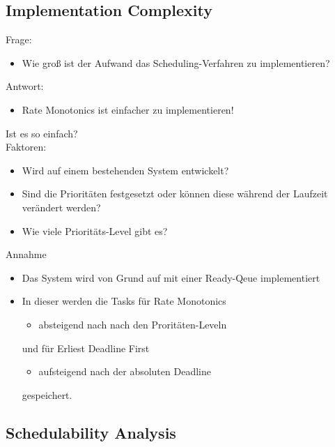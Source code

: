 \subsection{Implementation Complexity}
\begin{frame}{\subsecname}
	Frage:
	\begin{itemize}
		\item Wie groß ist der Aufwand das Scheduling-Verfahren zu implementieren?
	\end{itemize}
	Antwort:
	\begin{itemize}
		\item Rate Monotonics ist einfacher zu implementieren!
	\end{itemize}
\end{frame}

\begin{frame}{\subsecname}
	Ist es so einfach?\\\pause
	Faktoren:
	\begin{itemize}
		\item Wird auf einem bestehenden System entwickelt?
		\item Sind die Prioritäten festgesetzt oder können diese während der Laufzeit verändert werden?
		\item Wie viele Prioritäts-Level gibt es? %
	\end{itemize}
\end{frame}

\begin{frame}{\subsecname}
	Annahme
	\begin{itemize}
		\item Das System wird von Grund auf mit einer Ready-Qeue implementiert\pause
		\item In dieser werden die Tasks für Rate Monotonics
			\begin{itemize}
				\item absteigend nach nach den Proritäten-Leveln
			\end{itemize}
			und für Erliest Deadline First
			\begin{itemize}
				\item aufsteigend nach der absoluten Deadline
			\end{itemize} gespeichert.
	\end{itemize}
\end{frame}



\subsection{Schedulability Analysis}
\begin{frame}{\subsecname}
\end{frame}

